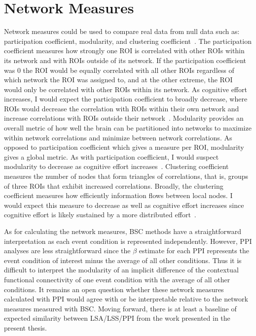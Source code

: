 \documentclass[phd,figures,tables,ackpage,abstractpage,publicabstractpage]{uithesis}
\begin{document}
\section{Network Measures}
\label{network-measures}

Network measures could be used to compare real data from null data such as: participation coefficient,
modularity, and clustering coefficient~\cite{Rubinov2010}.
The participation coefficient measures how strongly one ROI is correlated with other ROIs within its
network and with ROIs outside of its network.
If the participation coefficient was 0 the ROI would be equally
correlated with all other ROIs regardless of which network the
ROI was assigned to, and at the other extreme, the ROI would only be correlated with other ROIs within its
network.
As cognitive effort increases, I would expect the participation coefficient to broadly decrease, where ROIs
would decrease the correlation with ROIs within their own network and increase correlations with ROIs outside
their network~\cite{Ito2019,Gonzalez-Castillo2018}.
Modularity provides an overall metric of how well the brain can be partitioned into networks to maximize
within network correlations and minimize between network correlations.
As opposed to participation coefficient which gives a measure per ROI, modularity gives a global metric.
As with participation coefficient, I would suspect modularity to decrease
as cognitive effort increases~\cite{Gonzalez-Castillo2018}.
Clustering coefficient measures the number of nodes that form triangles of correlations, that is, groups of three
ROIs that exhibit increased correlations.
Broadly, the clustering coefficient measures how efficiently information flows between local nodes.
I would expect this measure to decrease as well as cognitive effort increases since cognitive effort is likely
sustained by a more distributed effort~\cite{Di2013}.

As for calculating the network measures, BSC methods have a straightforward interpretation as each
event condition is represented independently.
However, PPI analyses are less straightforward since the $\beta$ estimate for each PPI represents
the event condition of interest minus the average of all other conditions.
Thus it is difficult to interpret the modularity of an implicit difference of the contextual functional connectivity
of one event condition with the average of all other conditions.
It remains an open question whether these network measures calculated with PPI would agree with or be interpretable relative
to the network measures measured with BSC.
Moving forward, there is at least a baseline of expected similarity between LSA/LSS/PPI from the work presented
in the present thesis.
\end{document}
